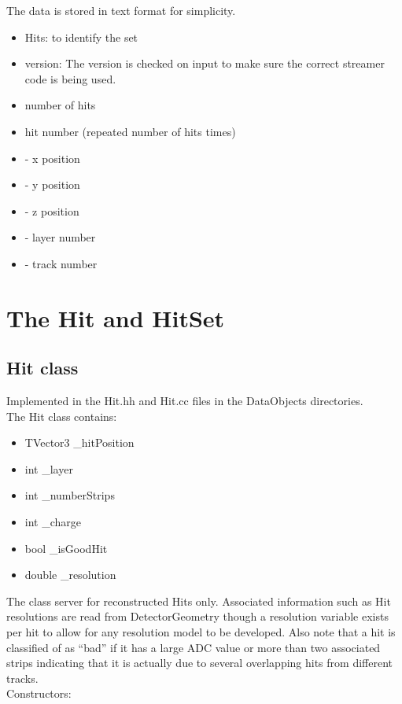 \documentclass[aps,prd,superscriptaddress,floatfix]{revtex4}
\begin{document}
The data is stored in text format for simplicity.

\begin{itemize}
\item  Hits: to identify the set
\item version: The version is checked on input to make sure the correct streamer code is being used.
\item number of hits
\item hit number (repeated number of hits times)
\item - x position
\item - y position
\item - z position
\item - layer number
\item - track number 
\end{itemize}

\section{The Hit and HitSet}
\subsection{Hit class}
Implemented in the Hit.hh and Hit.cc files in the DataObjects directories.
\\

The Hit class contains:\\

\begin{itemize}
\item TVector3 \_hitPosition
\item int \_layer
\item int \_numberStrips
\item int \_charge
\item bool \_isGoodHit
\item double \_resolution 
\end{itemize}


The class server for reconstructed Hits only.   Associated information such as Hit resolutions
are read from DetectorGeometry though a resolution variable exists per hit to allow for any resolution model
to be developed.  Also note that a hit is classified of as ``bad'' if it has a large ADC
value or more than two associated strips indicating that it is actually due to several overlapping hits from
different tracks.
\\

Constructors:
\end{document}
